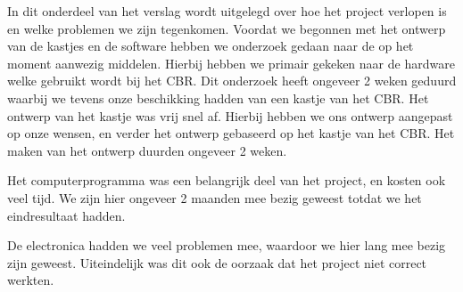 In dit onderdeel van het verslag wordt uitgelegd over hoe het project verlopen is en welke problemen we zijn tegenkomen.
Voordat we begonnen met het ontwerp van de kastjes en de software hebben we onderzoek gedaan naar de op het moment aanwezig middelen. Hierbij hebben we primair gekeken naar de hardware welke gebruikt wordt bij het CBR. Dit onderzoek heeft ongeveer 2 weken geduurd waarbij we tevens onze beschikking hadden van een kastje van het CBR. 
Het ontwerp van het kastje was vrij snel af. Hierbij hebben we ons ontwerp aangepast op onze wensen, en verder het ontwerp gebaseerd op het kastje van het CBR. Het maken van het ontwerp duurden ongeveer 2 weken.

Het computerprogramma was een belangrijk deel van het project, en kosten ook veel tijd. We zijn hier ongeveer 2 maanden mee bezig geweest totdat we het eindresultaat hadden.

De electronica hadden we veel problemen mee, waardoor we hier lang mee bezig zijn geweest. Uiteindelijk was dit ook de oorzaak dat het project niet correct werkten.
